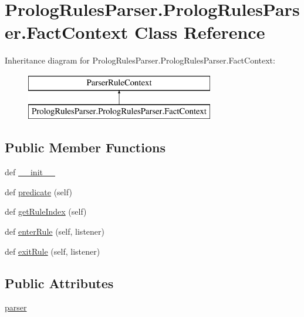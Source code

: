 \hypertarget{class_prolog_rules_parser_1_1_prolog_rules_parser_1_1_fact_context}{}\section{Prolog\+Rules\+Parser.\+Prolog\+Rules\+Parser.\+Fact\+Context Class Reference}
\label{class_prolog_rules_parser_1_1_prolog_rules_parser_1_1_fact_context}
Inheritance diagram for Prolog\+Rules\+Parser.\+Prolog\+Rules\+Parser.\+Fact\+Context\+:\begin{figure}[H]
\begin{center}
\leavevmode
\includegraphics[height=2.000000cm]{class_prolog_rules_parser_1_1_prolog_rules_parser_1_1_fact_context}
\end{center}
\end{figure}
\subsection*{Public Member Functions}
\begin{DoxyCompactItemize}
\item 
def \hyperlink{class_prolog_rules_parser_1_1_prolog_rules_parser_1_1_fact_context_acf8b76fd5569948a2c528a6f7dbcacd2}{\+\_\+\+\_\+init\+\_\+\+\_\+}
\item 
def \hyperlink{class_prolog_rules_parser_1_1_prolog_rules_parser_1_1_fact_context_a1ac1cf4e8526cae0a1f5bc9c7e47a715}{predicate} (self)
\item 
def \hyperlink{class_prolog_rules_parser_1_1_prolog_rules_parser_1_1_fact_context_a008eb2cbf6d688744f8884fca5bccae4}{get\+Rule\+Index} (self)
\item 
def \hyperlink{class_prolog_rules_parser_1_1_prolog_rules_parser_1_1_fact_context_a9880eea916c1d066016a965f42618a5c}{enter\+Rule} (self, listener)
\item 
def \hyperlink{class_prolog_rules_parser_1_1_prolog_rules_parser_1_1_fact_context_a0a11cc822276f360dca79a80ad0830f9}{exit\+Rule} (self, listener)
\end{DoxyCompactItemize}
\subsection*{Public Attributes}
\begin{DoxyCompactItemize}
\item 
\hyperlink{class_prolog_rules_parser_1_1_prolog_rules_parser_1_1_fact_context_acd51a0725334ef43f7bcfc14f307011c}{parser}
\end{DoxyCompactItemize}


